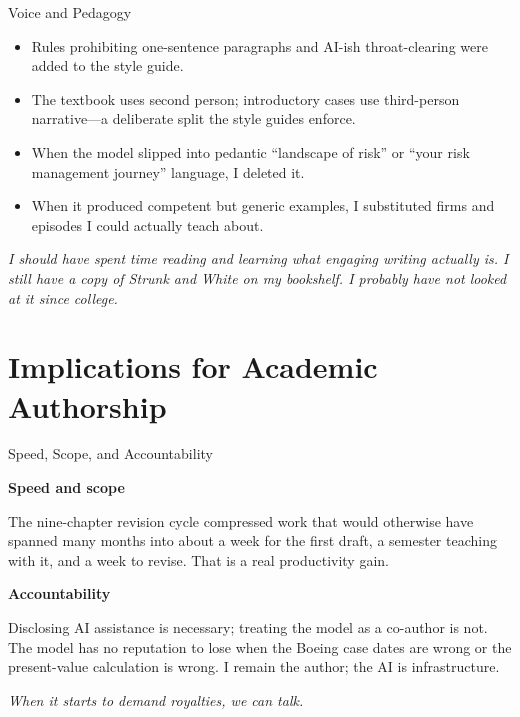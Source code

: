 \documentclass[aspectratio=169]{beamer}
\begin{document}
\begin{frame}{Voice and Pedagogy}

\begin{itemize}\setlength\itemsep{0.8em}
  \item Rules prohibiting one-sentence paragraphs and AI-ish
        throat-clearing were added to the style guide.
  \item The textbook uses second person; introductory cases use
        third-person narrative---a deliberate split the style guides enforce.
  \item When the model slipped into pedantic ``landscape of risk'' or
        ``your risk management journey'' language, I deleted it.
  \item When it produced competent but generic examples, I substituted
        firms and episodes I could actually teach about.
\end{itemize}

\bigskip
\textit{I should have spent time reading and learning what engaging writing
actually is. I still have a copy of Strunk and White on my bookshelf. I
probably have not looked at it since college.}

\end{frame}

\section{Implications for Academic Authorship}

\begin{frame}{Speed, Scope, and Accountability}

\textbf{Speed and scope}

\smallskip
The nine-chapter revision cycle compressed work that would otherwise have
spanned many months into about a week for the first draft, a semester
teaching with it, and a week to revise. That is a real productivity gain.

\bigskip
\textbf{Accountability}

\smallskip
Disclosing AI assistance is necessary; treating the model as a co-author
is not. The model has no reputation to lose when the Boeing case dates are
wrong or the present-value calculation is wrong. I remain the author; the
AI is infrastructure.

\bigskip
\textit{When it starts to demand royalties, we can talk.}

\end{frame}
\end{document}
